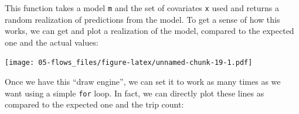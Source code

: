 \documentclass[
]{book}
\newenvironment{Shaded}{\begin{snugshade}}{\end{snugshade}}
\newcommand{\DataTypeTok}[1]{\textcolor[rgb]{0.13,0.29,0.53}{#1}}
\newcommand{\DecValTok}[1]{\textcolor[rgb]{0.00,0.00,0.81}{#1}}
\newcommand{\KeywordTok}[1]{\textcolor[rgb]{0.13,0.29,0.53}{\textbf{#1}}}
\newcommand{\NormalTok}[1]{#1}
\newcommand{\OperatorTok}[1]{\textcolor[rgb]{0.81,0.36,0.00}{\textbf{#1}}}
\newcommand{\StringTok}[1]{\textcolor[rgb]{0.31,0.60,0.02}{#1}}
\begin{document}
This function takes a model \texttt{m} and the set of covariates \texttt{x} used and returns a random realization of predictions from the model. To get a sense of how this works, we can get and plot a realization of the model, compared to the expected one and the actual values:

\begin{Shaded}
\end{Shaded}

\texttt{[image: 05-flows\_files/figure-latex/unnamed-chunk-19-1.pdf]}

Once we have this ``draw engine'', we can set it to work as many times as we want using a simple \texttt{for} loop. In fact, we can directly plot these lines as compared to the expected one and the trip count:
\end{document}
